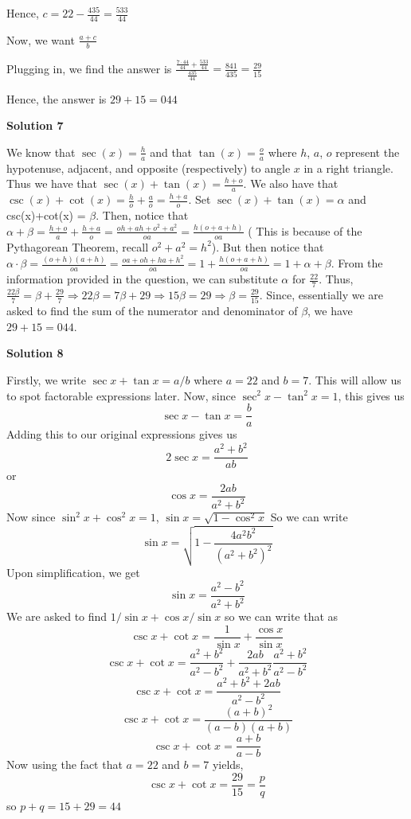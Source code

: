 \begin{enumerate}
 Hence, $c=22-\frac{435}{44}=\frac{533}{44}$

 Now, we want $\frac{a+c}{b}$

 Plugging in, we find the answer is $\frac{\frac{7\cdot{44}}{44}+\frac{533}{44}}{\frac{435}{44}}=\frac{841}{435}=\frac{29}{15}$

 Hence, the answer is $29+15=\boxed{044}$




\textbf{Solution 7}

We know that $\sec(x) = \frac{h}{a}$ and that $\tan(x) = \frac{o}{a}$ where $h$, $a$, $o$ represent the hypotenuse, adjacent, and opposite (respectively) to angle $x$ in a right triangle. Thus we have that $\sec(x) + \tan(x) = \frac{h+o}{a}$. We also have that $\csc(x) + \cot(x) = \frac{h}{o} + \frac{a}{o} = \frac{h+a}{o}$. Set $\sec(x) + \tan(x) = \alpha$ and csc(x)+cot(x) = $\beta$. Then, notice that $\alpha + \beta = \frac{h+o}{a} + \frac{h+a}{o} = \frac{oh+ah+o^2 + a^2}{oa} = \frac{h(o+a+h)}{oa}$ ( This is because of the Pythagorean Theorem, recall $o^2 +a^2 = h^2$). But then notice that $\alpha \cdot \beta = \frac{(o+h)(a+h)}{oa} = \frac{oa +oh +ha +h^2}{oa} = 1+ \frac{h(o+a+h)}{oa} = 1+ \alpha + \beta$. From the information provided in the question, we can substitute $\alpha$ for $\frac{22}{7}$. Thus, $\frac{22 \beta}{7}= \beta + \frac{29}{7} \Longrightarrow 22 \beta = 7 \beta + 29 \Longrightarrow 15 \beta = 29 \Longrightarrow \beta = \frac{29}{15}$. Since, essentially we are asked to find the sum of the numerator and denominator of $\beta$, we have $29 + 15 = \boxed{044}$.

 


 



\textbf{Solution 8}

Firstly, we write $\sec x+\tan x=a/b$ where $a=22$ and $b=7$. This will allow us to spot factorable expressions later. Now, since $\sec^2x-\tan^2x=1$, this gives us 
 \[\sec x-\tan x=\frac{b}{a}\] Adding this to our original expressions gives us 
 \[2\sec x=\frac{a^2+b^2}{ab}\] or 
 \[\cos x=\frac{2ab}{a^2+b^2}\] Now since $\sin^2x+\cos^2x=1$, $\sin x=\sqrt{1-\cos^2x}$ So we can write 
 \[\sin x=\sqrt{1-\frac{4a^2b^2}{(a^2+b^2)^2}}\] Upon simplification, we get 
 \[\sin x=\frac{a^2-b^2}{a^2+b^2}\] We are asked to find $1/\sin x+\cos x/\sin x$ so we can write that as 
 \[\csc x+\cot x=\frac{1}{\sin x}+\frac{\cos x}{\sin x}\] 
 \[\csc x+\cot x=\frac{a^2+b^2}{a^2-b^2}+\frac{2ab}{a^2+b^2}\frac{a^2+b^2}{a^2-b^2}\] 
 \[\csc x+\cot x=\frac{a^2+b^2+2ab}{a^2-b^2}\] 
 \[\csc x+\cot x=\frac{(a+b)^2}{(a-b)(a+b)}\] 
 \[\csc x+\cot x=\frac{a+b}{a-b}\] Now using the fact that $a=22$ and $b=7$ yields, 
 \[\csc x+\cot x=\frac{29}{15}=\frac{p}{q}\] so $p+q=15+29=\boxed{44}$





\end{enumerate}
